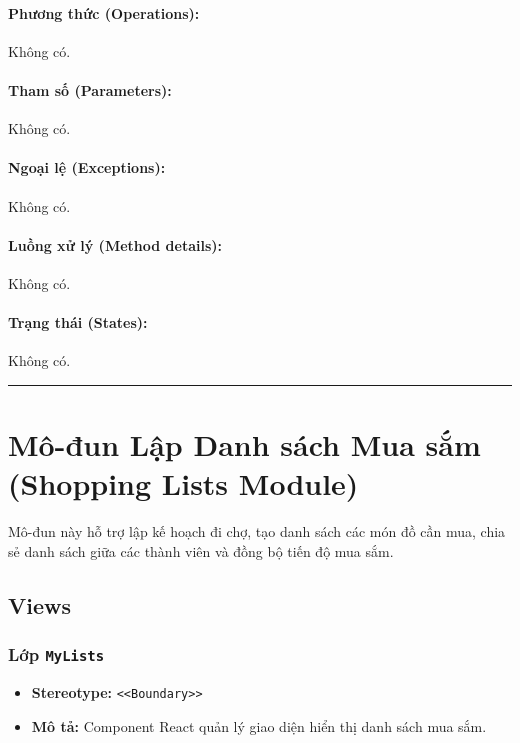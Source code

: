 \documentclass[12pt,a4paper]{article}
\begin{document}
\paragraph{Phương thức (Operations):}
Không có.

\paragraph{Tham số (Parameters):}
Không có.

\paragraph{Ngoại lệ (Exceptions):}
Không có.

\paragraph{Luồng xử lý (Method details):}
Không có.

\paragraph{Trạng thái (States):}
Không có.

\vskip 0.5cm
\noindent\rule{\textwidth}{0.5pt}
\vskip 0.5cm

\section{Mô-đun Lập Danh sách Mua sắm (Shopping Lists Module)}

Mô-đun này hỗ trợ lập kế hoạch đi chợ, tạo danh sách các món đồ cần mua, chia sẻ danh sách giữa các thành viên và đồng bộ tiến độ mua sắm.

\subsection{Views}

\subsubsection{Lớp \texttt{MyLists}}
\begin{itemize}[leftmargin=*]
    \item \textbf{Stereotype:} \texttt{\textless{}\textless{}Boundary\textgreater{}\textgreater{}}
    \item \textbf{Mô tả:} Component React quản lý giao diện hiển thị danh sách mua sắm.
\end{itemize}
\end{document}
